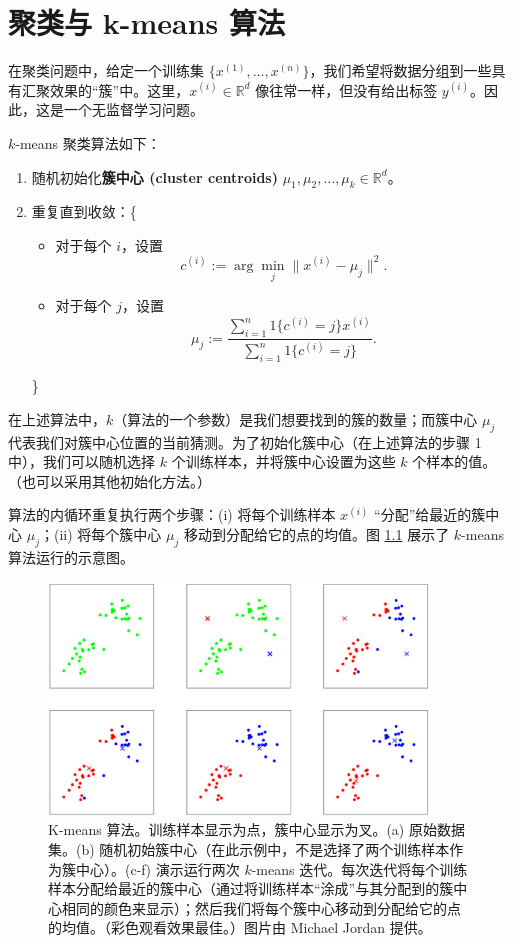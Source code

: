 \chapter{聚类与 k-means 算法}

在聚类问题中，给定一个训练集 $\{x^{(1)}, \dots, x^{(n)}\}$，我们希望将数据分组到一些具有汇聚效果的“簇”中。这里，$x^{(i)} \in \mathbb{R}^d$ 像往常一样，但没有给出标签 $y^{(i)}$。因此，这是一个无监督学习问题。

$k$-means 聚类算法如下：

\begin{enumerate}
    \item 随机初始化\textbf{簇中心 (cluster centroids)} $\mu_1, \mu_2, \dots, \mu_k \in \mathbb{R}^d$。
    \item 重复直到收敛：\{
    \begin{itemize}
        \item[] 对于每个 $i$，设置
        \[
            c^{(i)} := \arg \min_j \|x^{(i)} - \mu_j\|^2.
        \]
        \item[] 对于每个 $j$，设置
        \[
            \mu_j := \frac{\sum_{i=1}^n {1}\{c^{(i)} = j\} x^{(i)}}{\sum_{i=1}^n {1}\{c^{(i)} = j\}}.
        \]
    \end{itemize}
    \noindent\quad\}
\end{enumerate}

在上述算法中，$k$（算法的一个参数）是我们想要找到的簇的数量；而簇中心 $\mu_j$ 代表我们对簇中心位置的当前猜测。为了初始化簇中心（在上述算法的步骤 1 中），我们可以随机选择 $k$ 个训练样本，并将簇中心设置为这些 $k$ 个样本的值。（也可以采用其他初始化方法。）

算法的内循环重复执行两个步骤：(i) 将每个训练样本 $x^{(i)}$ “分配”给最近的簇中心 $\mu_j$；(ii) 将每个簇中心 $\mu_j$ 移动到分配给它的点的均值。图 \ref{fig:10.1} 展示了 $k$-means 算法运行的示意图。

\begin{figure}[H]
    \centering
    \includegraphics[width=0.9\textwidth]{figs/k-means.png}
    \caption{K-means 算法。训练样本显示为点，簇中心显示为叉。(a) 原始数据集。(b) 随机初始簇中心（在此示例中，不是选择了两个训练样本作为簇中心）。(c-f) 演示运行两次 $k$-means 迭代。每次迭代将每个训练样本分配给最近的簇中心（通过将训练样本“涂成”与其分配到的簇中心相同的颜色来显示）；然后我们将每个簇中心移动到分配给它的点的均值。（彩色观看效果最佳。）图片由 Michael Jordan 提供。}
    \label{fig:10.1}
\end{figure}

